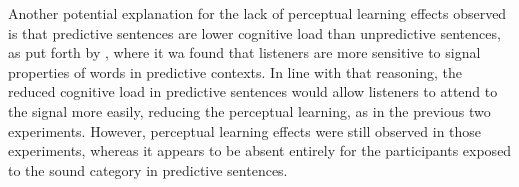 Another potential explanation for the lack of perceptual learning effects observed is that predictive sentences are lower cognitive load than unpredictive sentences, as put forth by \citet{Samuel1981}, where it wa found that listeners are more sensitive to signal properties of words in predictive contexts.  In line with that reasoning, the reduced cognitive load in predictive sentences would allow listeners to attend to the signal more easily, reducing the perceptual learning, as in the previous two experiments.  However, perceptual learning effects were still observed in those experiments, whereas it appears to be absent entirely for the participants exposed to the sound category in predictive sentences.
